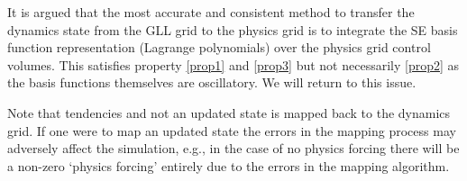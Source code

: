 It is argued that the most accurate and consistent method to transfer the dynamics state from the GLL grid to the physics grid is to integrate the SE basis function representation (Lagrange polynomials) over the physics grid control volumes. This satisfies property \ref{prop1} and \ref{prop3} but not necessarily \ref{prop2} as the basis functions themselves are oscillatory. We will return to this issue.


Note that tendencies and not an updated state is mapped back to the dynamics grid. If one were to map an updated state the errors in the mapping process may adversely affect the simulation, e.g., in the case of no physics forcing there will be a non-zero `physics forcing' entirely due to the errors in the mapping algorithm.

